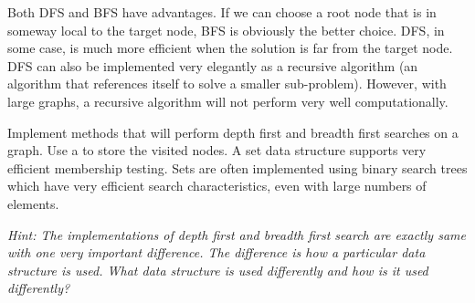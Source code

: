 Both DFS and BFS have advantages.  
If we can choose a root node that is in someway local to the target node, BFS is obviously the better choice.
DFS, in some case, is much more efficient when the solution is far from the target node.
DFS can also be implemented very elegantly as a recursive algorithm (an algorithm that references itself to solve a smaller sub-problem).
However, with large graphs, a recursive algorithm will not perform very well computationally.

\begin{problem}
Implement methods that will perform depth first and breadth first searches on a graph.
Use a  to store the visited nodes.  A set data structure supports very efficient membership testing.
Sets are often implemented using binary search trees which have very efficient search characteristics, even with large numbers of elements.

\textit{Hint: The implementations of depth first and breadth first search are exactly same with one very important difference.
The difference is how a particular data structure is used.  What data structure is used differently and how is it used differently?}
\end{problem}
